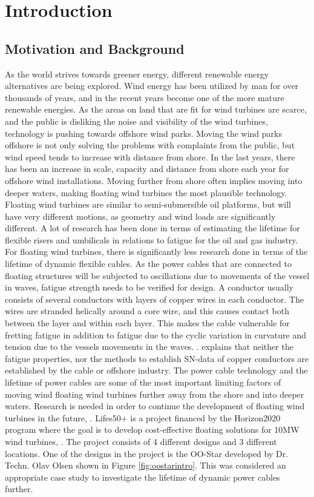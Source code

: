 \chapter{Introduction}
\label{chap:introduction}
\section{Motivation and Background}
As the world strives towards greener energy, different renewable energy alternatives are being explored. Wind energy has been utilized by man for over thousands of years, and in the recent years become one of the more mature renewable energies. As the areas on land that are fit for wind turbines are scarce, and the public is disliking the noise and visibility of the wind turbines, technology is pushing towards offshore wind parks. Moving the wind parks offshore is not only solving the problems with complaints from the public, but wind speed tends to increase with distance from shore. In the last years, there has been an increase in scale, capacity and distance from shore each year for offshore wind installations. Moving further from shore often implies moving into deeper waters, making floating wind turbines the most plausible technology. Floating wind turbines are similar to semi-submersible oil platforms, but will have very different motions, as geometry and wind loads are significantly different. A lot of research has been done in terms of estimating the lifetime for flexible risers and umbilicals in relations to fatigue for the oil and gas industry. For floating wind turbines, there is significantly less research done in terms of the lifetime of dynamic flexible cables. As the power cables that are connected to floating structures will be subjected to oscillations due to movements of the vessel in waves, fatigue strength needs to be verified for design. A conductor usually consists of several conductors with layers of copper wires in each conductor. The wires are stranded helically around a core wire, and this causes contact both between the layer and within each layer. This makes the cable vulnerable for fretting fatigue in addition to fatigue due to the cyclic variation in curvature and tension due to the vessels movements in the waves.  \cite{Savik2014}. \cite{Karlsen2010} explains that neither the fatigue properties, nor the methods to establish SN-data of copper conductors are established by the cable or offshore industry.  The power cable technology and the lifetime of power cables are some of the most important limiting factors of moving wind floating wind turbines further away from the shore and into deeper waters.   Research is needed in order to continue the development of floating wind turbines in the future, \cite{Thies2012}.
\newline
\newline
Lifes50+ is a project financed by the Horizon2020 program where the goal is to develop cost-effective floating solutions for 10MW wind turbines, \cite{Horizon2010}. The project consists of 4 different designs and 3 different locations. One of the designs in the project is the OO-Star developed by Dr. Techn. Olav Olsen shown in Figure \ref{fig:oostarintro}. This was considered an appropriate case study to investigate the lifetime of dynamic power cables further.

